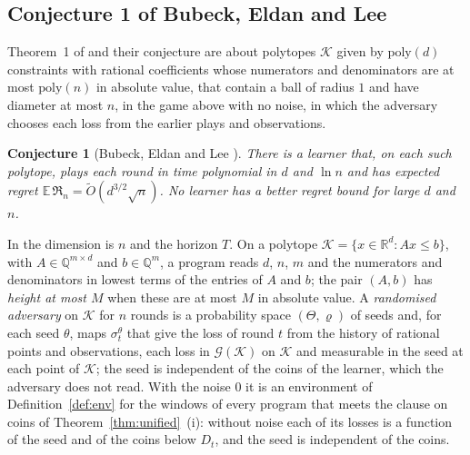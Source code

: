 \documentclass[11pt]{amsart}
\newtheorem*{conjecture}{Conjecture}
\theoremstyle{definition}
\numberwithin{equation}{section}
\newcommand{\R}{\mathbb{R}}
\newcommand{\E}{\mathbb{E}}
\newcommand{\cK}{\mathcal{K}}
\newcommand{\cG}{\mathscr{G}}
\newcommand{\Reg}{\mathfrak{R}}
\begin{document}
\subsection{Conjecture 1 of Bubeck, Eldan and Lee}\label{sec:intro-conj}

Theorem~1 of \cite{BEL21} and their conjecture are about polytopes $\cK$ given by $\mathrm{poly}(d)$ constraints with rational coefficients whose numerators and denominators are at most $\mathrm{poly}(n)$ in absolute value, that contain a ball of radius $1$ and have diameter at most $n$, in the game above with no noise, in which the adversary chooses each loss from the earlier plays and observations.
\begin{conjecture}[{Bubeck, Eldan and Lee \cite[Section~1.1, Conjecture~1]{BEL21}}]
There is a learner that, on each such polytope, plays each round in time polynomial in $d$ and $\ln n$ and has expected regret $\E\,\Reg_n=\tilde O(d^{3/2}\sqrt n)$. No learner has a better regret bound for large $d$ and $n$.
\end{conjecture}
In \cite{BEL21} the dimension is $n$ and the horizon $T$. On a polytope $\cK=\{x\in\R^d:Ax\le b\}$, with $A\in\mathbb Q^{m\times d}$ and $b\in\mathbb Q^m$, a program reads $d$, $n$, $m$ and the numerators and denominators in lowest terms of the entries of $A$ and $b$; the pair $(A,b)$ has \emph{height at most $M$} when these are at most $M$ in absolute value. A \emph{randomised adversary} on $\cK$ for $n$ rounds is a probability space $(\Theta,\varrho)$ of seeds and, for each seed $\theta$, maps $\sigma^\theta_t$ that give the loss of round $t$ from the history of rational points and observations, each loss in $\cG(\cK)$ on $\cK$ and measurable in the seed at each point of $\cK$; the seed is independent of the coins of the learner, which the adversary does not read. With the noise $0$ it is an environment of Definition~\ref{def:env} for the windows of every program that meets the clause on coins of Theorem~\ref{thm:unified}~(i): without noise each of its losses is a function of the seed and of the coins below $D_t$, and the seed is independent of the coins.
\end{document}

